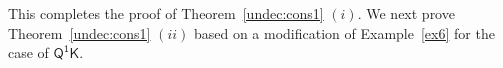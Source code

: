 \documentclass[10pt,a4paper]{amsart}
\theoremstyle{plain}
\theoremstyle{definition}
\newcommand{\FOMK}{\ensuremath{\mathsf{Q^1K}}}
\newcommand{\fform}[1]{\boldsymbol{#1}}
\newcommand{\pvar}{\fform{p}}
\newcommand{\avar}{\fform{a}}
\newcommand{\gvar}{\fform{g}}
\begin{document}
This completes the proof of Theorem~\ref{undec:cons1} $(i)$.
We next prove Theorem~\ref{undec:cons1} $(ii)$ based on a modification of Example~\ref{ex6} for the case of $\FOMK{}$.
% 
\end{document}
